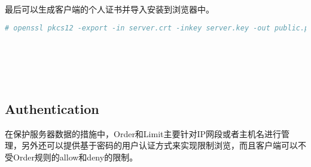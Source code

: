 最后可以生成客户端的个人证书并导入安装到浏览器中。




\begin{lstlisting}[language=bash]
# openssl pkcs12 -export -in server.crt -inkey server.key -out public.p12 -name "public"
\end{lstlisting}





\begin{lstlisting}[language=bash]

\end{lstlisting}





\begin{lstlisting}[language=bash]

\end{lstlisting}





\begin{lstlisting}[language=bash]

\end{lstlisting}





\begin{lstlisting}[language=bash]

\end{lstlisting}






\begin{lstlisting}[language=bash]

\end{lstlisting}






\begin{lstlisting}[language=bash]

\end{lstlisting}




\subsection{Authentication}

在保护服务器数据的措施中，Order和Limit主要针对IP网段或者主机名进行管理，另外还可以提供基于密码的用户认证方式来实现限制浏览，而且客户端可以不受Order规则的allow和deny的限制。

